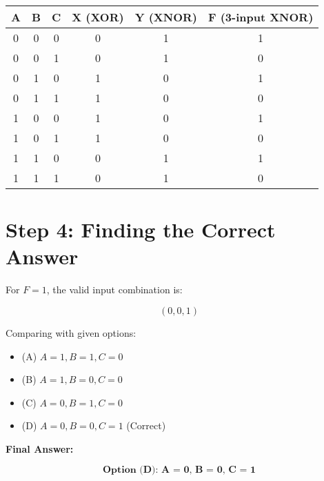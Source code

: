 \documentclass[a4paper,12pt]{article}
\begin{document}
\begin{center}
    \begin{tabular}{|c|c|cc|cc|}
        \hline
        A & B & C & X (XOR) & Y (XNOR) & F (3-input XNOR) \\ 
        \hline
        0 & 0 & 0 & 0 & 1 & 1 \\  
        0 & 0 & 1 & 0 & 1 & 0 \\  
        0 & 1 & 0 & 1 & 0 & 1 \\  
        0 & 1 & 1 & 1 & 0 & 0 \\  
        1 & 0 & 0 & 1 & 0 & 1 \\  
        1 & 0 & 1 & 1 & 0 & 0 \\  
        1 & 1 & 0 & 0 & 1 & 1 \\  
        1 & 1 & 1 & 0 & 1 & 0 \\  
        \hline
    \end{tabular}
\end{center}
\hrulefill

\section*{Step 4: Finding the Correct Answer}

For $F = 1$, the valid input combination is:

\[
(0,0,1)
\]

Comparing with given options:

\begin{itemize}
    \item (A) $A = 1, B = 1, C = 0$
    \item (B) $A = 1, B = 0, C = 0$
    \item (C) $A = 0, B = 1, C = 0$ 
    \item (D) $A = 0, B = 0, C = 1$  (Correct)
\end{itemize}

\textbf{Final Answer:}  

\[
\textbf{Option (D): A = 0, B = 0, C = 1}
\]
\end{document}
